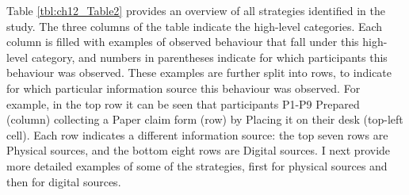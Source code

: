 Table \ref{tbl:ch12_Table2} provides an overview of all strategies identified in the study. The three columns of the table indicate the high-level categories. Each column is filled with examples of observed behaviour that fall under this high-level category, and numbers in parentheses indicate for which participants this behaviour was observed. These examples are further split into rows, to indicate for which particular information source this behaviour was observed. For example, in the top row it can be seen that participants P1-P9 Prepared (column) collecting a Paper claim form (row) by Placing it on their desk (top-left cell). Each row indicates a different information source: the top seven rows are Physical sources, and the bottom eight rows are Digital sources. I next provide more detailed examples of some of the strategies, first for physical sources and then for digital sources.

